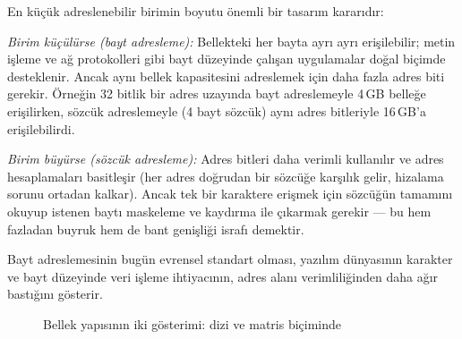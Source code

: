 \begin{karsilastirma}
En küçük adreslenebilir birimin boyutu önemli bir tasarım kararıdır:

\textit{Birim küçülürse (bayt adresleme):} Bellekteki her bayta ayrı ayrı erişilebilir; metin işleme ve ağ protokolleri gibi bayt düzeyinde çalışan uygulamalar doğal biçimde desteklenir. Ancak aynı bellek kapasitesini adreslemek için daha fazla adres biti gerekir. Örneğin 32 bitlik bir adres uzayında bayt adreslemeyle 4\,GB belleğe erişilirken, sözcük adreslemeyle (4 bayt sözcük) aynı adres bitleriyle 16\,GB'a erişilebilirdi.

\textit{Birim büyürse (sözcük adresleme):} Adres bitleri daha verimli kullanılır ve adres hesaplamaları basitleşir (her adres doğrudan bir sözcüğe karşılık gelir, hizalama sorunu ortadan kalkar). Ancak tek bir karaktere erişmek için sözcüğün tamamını okuyup istenen baytı maskeleme ve kaydırma ile çıkarmak gerekir --- bu hem fazladan buyruk hem de bant genişliği israfı demektir.

Bayt adreslemesinin bugün evrensel standart olması, yazılım dünyasının karakter ve bayt düzeyinde veri işleme ihtiyacının, adres alanı verimliliğinden daha ağır bastığını gösterir.
\end{karsilastirma}

\begin{figure}[H]
\centering
{}
\caption[Bellek yapısının iki gösterimi]{Bellek yapısının iki gösterimi: dizi ve matris biçiminde}
\label{fig:bellek-yapisi}
\end{figure}

